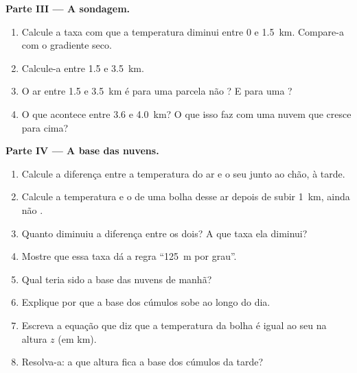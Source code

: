 \begin{problem}
\medskip
\noindent\textbf{Parte III --- A sondagem.}
\begin{enumerate}[resume]
  \item Calcule a taxa com que a temperatura diminui entre \num{0} e
        \qty{1.5}{km}. Compare-a com o gradiente seco.
  \item Calcule-a entre \num{1.5} e \qty{3.5}{km}.
  \item O ar entre \num{1.5} e \qty{3.5}{km} é  para uma parcela não
        ? E para uma ?
  \item O que acontece entre \num{3.6} e \qty{4.0}{km}? O que isso faz com
        uma nuvem que cresce para cima?
\end{enumerate}

\medskip
\noindent\textbf{Parte IV --- A base das nuvens.}
\begin{enumerate}[resume]
  \item Calcule a diferença entre a temperatura do ar e o seu  junto ao chão, à tarde.
  \item Calcule a temperatura e o  de uma bolha desse ar
        depois de subir \qty{1}{km}, ainda não .
  \item Quanto diminuiu a diferença entre os dois? A que taxa ela diminui?
  \item Mostre que essa taxa dá a regra ``\qty{125}{m} por grau''.
  \item Qual teria sido a base das nuvens de manhã?
  \item Explique por que a base dos cúmulos sobe ao longo do dia.
  \item Escreva a equação que diz que a temperatura da bolha é igual ao seu
         na altura $z$ (em km).
  \item Resolva-a: a que altura fica a base dos cúmulos da tarde?
\end{enumerate}
\end{problem}
